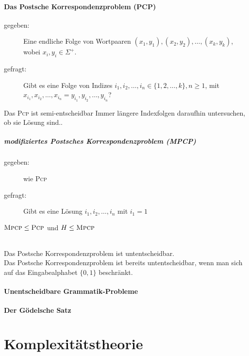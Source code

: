 \documentclass{scrartcl}
\begin{document}
\subsection*{Das Postsche Korrespondenzproblem (PCP)}
\begin{description}
    \item[gegeben:] Eine endliche Folge von Wortpaaren $(x_1,y_1), (x_2,y_2),\dots,(x_k,y_k)$, wobei $x_i,y_i\in\Sigma^+$.
    \item[gefragt:] Gibt es eine Folge von Indizes $i_1,i_2,\dots,i_n\in\{1,2,\dots,k\},n\geq1$, mit $x_{i_1},x_{i_2},\dots,x_{i_n} = y_{i_1},y_{i_2},\dots,y_{i_n}$?
\end{description}
Das \textsc{Pcp} ist semi-entscheidbar {\tiny Immer längere Indexfolgen daraufhin untersuchen, ob sie Lösung sind.}.
\subsubsection*{modifiziertes Postsches Korrespondenzproblem (MPCP)}
\begin{description}
    \item[gegeben:] wie \textsc{Pcp}
    \item[gefragt:] Gibt es eine Lösung $i_1,i_2,\dots,i_n$ mit $i_1=1$
\end{description}

$\textsc{Mpcp} \leq \textsc{Pcp}$ und $H\leq \textsc{Mpcp} $

\begin{shaded}
\ \\
    Das Postsche Korrespondenzproblem ist untentscheidbar.\\[.5cm]
    Das Postsche Korrespondenzproblem ist bereits untentscheidbar, wenn man sich auf das Eingabealphabet $\{0,1\}$ beschränkt.
\end{shaded}

\subsection*{Unentscheidbare Grammatik-Probleme}
\subsection*{Der Gödelsche Satz}

\part*{Komplexitätstheorie}
\end{document}
